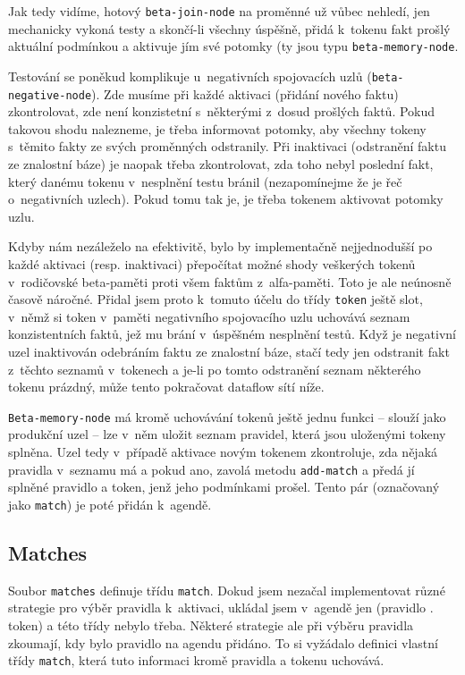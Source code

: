 Jak tedy vidíme, hotový \verb|beta-join-node| na proměnné už vůbec nehledí,
jen mechanicky vykoná testy a skončí-li všechny úspěšně, přidá k~tokenu
fakt prošlý aktuální podmínkou a aktivuje jím své potomky (ty jsou typu
\verb|beta-memory-node|.

Testování se poněkud komplikuje u~negativních spojovacích uzlů
(\verb|beta-negative-node|). Zde musíme při každé aktivaci (přidání nového
faktu) zkontrolovat, zde není konzistetní s~některými z~dosud prošlých faktů.
Pokud takovou shodu nalezneme, je třeba informovat potomky, aby všechny
tokeny s~těmito fakty ze svých proměnných odstranily. Při inaktivaci
(odstranění faktu ze znalostní báze) je naopak třeba zkontrolovat, zda toho
nebyl poslední fakt, který danému tokenu v~nesplnění testu bránil (nezapomínejme
že je řeč o~negativních uzlech). Pokud tomu tak je, je třeba tokenem aktivovat
potomky uzlu.

Kdyby nám nezáleželo na efektivitě, bylo by implementačně nejjednodušší po
každé aktivaci (resp. inaktivaci) přepočítat možné shody veškerých tokenů
v~rodičovské beta-paměti proti všem faktům z~alfa-paměti. Toto je ale
neúnosně časově náročné. Přidal jsem proto k~tomuto účelu do třídy \verb|token|
ještě slot, v~němž si token v~paměti negativního spojovacího uzlu uchovává
seznam konzistentních faktů, jež mu brání v~úspěšném nesplnění testů. Když
je negativní uzel inaktivován odebráním faktu ze znalostní báze, stačí tedy
jen odstranit fakt z~těchto seznamů v~tokenech a je-li po tomto odstranění
seznam některého tokenu prázdný, může tento pokračovat dataflow sítí níže.

\verb|Beta-memory-node| má kromě uchovávání tokenů ještě jednu funkci --
slouží jako produkční uzel -- lze v~něm uložit seznam pravidel, která jsou
uloženými tokeny splněna. Uzel tedy v~případě aktivace novým tokenem
zkontroluje, zda nějaká pravidla v~seznamu má a pokud ano, zavolá metodu
\verb|add-match| a předá jí splněné pravidlo a token, jenž jeho podmínkami
prošel. Tento pár (označovaný jako \verb|match|) je poté přidán k~agendě.
\subsection{Matches}
Soubor \verb|matches| definuje třídu \verb|match|. Dokud jsem nezačal
implementovat různé strategie pro výběr pravidla k~aktivaci, ukládal jsem
v~agendě jen (pravidlo . token) a této třídy nebylo třeba. Některé strategie ale
při výběru pravidla zkoumají, kdy bylo pravidlo na agendu přidáno. To si
vyžádalo definici vlastní třídy \verb|match|, která tuto informaci kromě
pravidla a tokenu uchovává.
